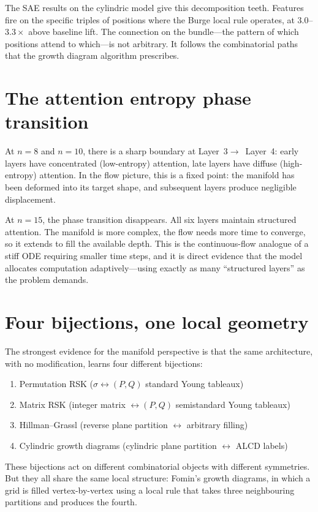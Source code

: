 \documentclass[11pt]{article}
\begin{document}
The SAE results on the cylindric model give this decomposition teeth.
Features fire on the specific triples of positions where the Burge
local rule operates, at $3.0$--$3.3\times$ above baseline lift. The
connection on the bundle---the pattern of which positions attend to
which---is not arbitrary. It follows the combinatorial paths that the
growth diagram algorithm prescribes.

\section*{The attention entropy phase transition}

At $n = 8$ and $n = 10$, there is a sharp boundary at
Layer~$3 \to$~Layer~4: early layers have concentrated (low-entropy)
attention, late layers have diffuse (high-entropy) attention. In the
flow picture, this is a fixed point: the manifold has been deformed
into its target shape, and subsequent layers produce negligible
displacement.

At $n = 15$, the phase transition disappears. All six layers maintain
structured attention. The manifold is more complex, the flow needs
more time to converge, so it extends to fill the available depth. This
is the continuous-flow analogue of a stiff ODE requiring smaller time
steps, and it is direct evidence that the model allocates computation
adaptively---using exactly as many ``structured layers'' as the
problem demands.

\section*{Four bijections, one local geometry}

The strongest evidence for the manifold perspective is that the same
architecture, with no modification, learns four different bijections:
\begin{enumerate}
  \item Permutation RSK ($\sigma \leftrightarrow (P, Q)$ standard Young tableaux)
  \item Matrix RSK (integer matrix $\leftrightarrow (P, Q)$ semistandard Young tableaux)
  \item Hillman--Grassl (reverse plane partition $\leftrightarrow$ arbitrary filling)
  \item Cylindric growth diagrams (cylindric plane partition $\leftrightarrow$ ALCD labels)
\end{enumerate}

These bijections act on different combinatorial objects with different
symmetries. But they all share the same local structure: Fomin's
growth diagrams, in which a grid is filled vertex-by-vertex using a
local rule that takes three neighbouring partitions and produces the
fourth.
\end{document}
